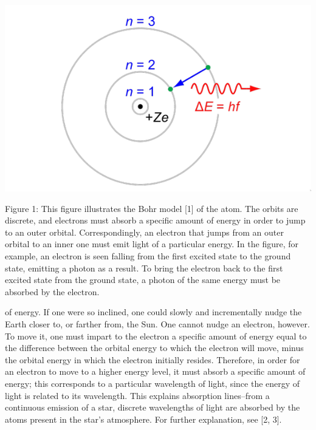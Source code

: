 \documentclass[12pt]{article}
\begin{document}

\begin{center}
    \includegraphics[scale=0.7]{fig1}
\end{center}

Figure 1: This figure illustrates the Bohr model [1] of the atom. \newline\newline
The orbits are discrete, and electrons must absorb a specific amount of energy in order to jump to an outer orbital. Correspondingly, an electron that jumps from an outer orbital to an inner one must emit light of a particular energy. In the figure, for example, an electron is seen falling from the first excited state to the ground state, emitting a photon as a result. To bring the electron back to the first excited state from the ground state, a photon of the same energy must be absorbed by the electron.\newline\newline 

of energy. If one were so inclined, one could slowly and incrementally nudge the Earth closer to, or farther from, the Sun. One cannot nudge an electron, however. To move it, one must impart to the electron a specific amount of energy equal to the difference between the orbital energy to which the electron will move, minus the orbital energy in which the electron initially resides. Therefore, in order for an electron to move to a higher energy level, it must absorb a specific amount of energy; this corresponds to a particular wavelength of light, since the energy of light is related to its wavelength. This explains absorption lines–from a continuous emission of a star, discrete wavelengths of light are absorbed by the atoms present in the star’s atmosphere. For further explanation, see [2, 3].
\end{document}
